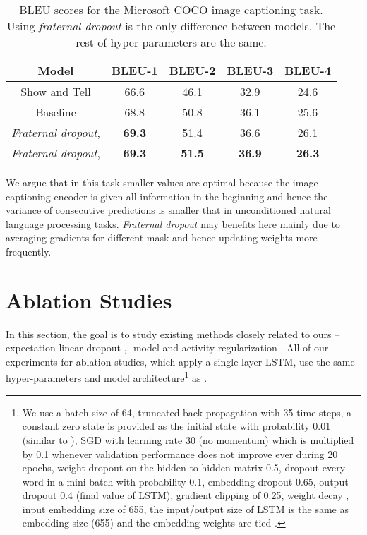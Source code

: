 \documentclass{article} \usepackage{iclr2018_conference,times}
\begin{document}
\begin{table}[t]
\vspace{-0.08cm}
\centering
\begin{tabular}{c | c c c c} 
\textbf{Model} & \textbf{BLEU-1} & \textbf{BLEU-2} & \textbf{BLEU-3} & \textbf{BLEU-4}\\
\hline
Show and Tell \cite{DBLP:journals/corr/XuBKCCSZB15} & 66.6 & 46.1 & 32.9 & 24.6\\
\hline
Baseline & 68.8 & 50.8 & 36.1 & 25.6 \\
\emph{Fraternal dropout},  & \textbf{69.3} & 51.4 & 36.6 & 26.1\\
\emph{Fraternal dropout},  & \textbf{69.3} & \textbf{51.5} & \textbf{36.9} & \textbf{26.3}\\
\end{tabular}
\caption{BLEU scores for the Microsoft COCO image captioning task. Using \emph{fraternal dropout} is the only difference between models. The rest of hyper-parameters are the same.}
\label{table:MSCOCO}
\vspace{-0.08cm}
\end{table}

We argue that in this task smaller  values are optimal because the image captioning encoder is given all information in the beginning and hence the variance of consecutive predictions is smaller that in unconditioned natural language processing tasks. \emph{Fraternal dropout} may benefits here mainly due to averaging gradients for different mask and hence updating weights more frequently.





\section{Ablation Studies}
\label{sec_ablation}
In this section, the goal is to study existing methods closely related to ours -- expectation linear dropout \cite{ma2016dropout}, -model \cite{laine2016temporal} and activity regularization \cite{ar_tar}. All of our experiments for ablation studies, which apply a single layer LSTM, use the same hyper-parameters and model architecture\footnote{We use a batch size of 64, truncated back-propagation with 35 time steps, a constant zero state is provided as the initial state with probability 0.01 (similar to \cite{melis2017state}), SGD with learning rate 30 (no momentum) which is multiplied by 0.1 whenever validation performance does not improve ever during 20 epochs, weight dropout on the hidden to hidden matrix 0.5, dropout every word in a mini-batch with probability 0.1, embedding dropout 0.65, output dropout 0.4 (final value of LSTM), gradient clipping of 0.25, weight decay , input embedding size of 655, the input/output size of LSTM is the same as embedding size (655) and the embedding weights are tied \citep{inan2016tying, press2016using}.} as \citet{melis2017state}.
\end{document}
